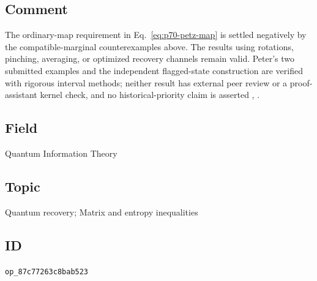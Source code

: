 \subsection*{Comment}

The ordinary-map requirement in
Eq.~\eqref{eq:p70-petz-map} is settled negatively by the compatible-marginal
counterexamples above. The results using rotations, pinching, averaging, or
optimized recovery channels remain valid. Peter's two submitted examples and
the independent flagged-state construction are verified with rigorous
interval methods; neither result has external peer review or a
proof-assistant kernel check, and no historical-priority claim is asserted
,
.

\subsection*{Field}

Quantum Information Theory

\subsection*{Topic}

Quantum recovery; Matrix and entropy inequalities

\subsection*{ID}

\texttt{op\_87c77263c8bab523}
